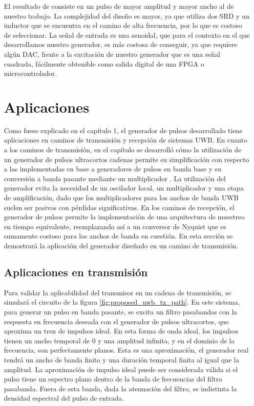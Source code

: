 El resultado de \cite{oloumi2018} consiste en un pulso de mayor amplitud y mayor
ancho al de nuestro trabajo. La complejidad del diseño es mayor, ya que utiliza
dos SRD y un inductor que se encuentra en el camino de alta frecuencia, por lo
que es costoso de seleccionar. La señal de entrada es una senoidal, que para el
contexto en el que desarrollamos nuestro generador, es más costosa de conseguir,
ya que requiere algún DAC, frente a la excitación de nuestro generador que es
una señal cuadrada, fácilmente obtenible como salida digital de una FPGA o
microcontrolador.

\section{Aplicaciones}

Como fuese explicado en el capítulo 1, el generador de pulsos desarrollado tiene
aplicaciones en caminos de transmisión y recepción de sistemas UWB. En cuanto a
los caminos de transmisión, en el
capítulo se desarrolló cómo la utilización de un generador de pulsos ultracortos
cadenas permite su simplificación con respecto a las implementadas en
base a generadores de pulsos en banda base y su conversión a banda pasante
mediante un multiplicador \cite{Altieri2021}. La utilización del generador
evita la necesidad de un oscilador local, un multiplicador y una etapa de
amplificación, dado que los multiplicadores para los anchos de banda UWB suelen
ser pasivos con pérdidas significativas. En los caminos de recepción, el
generador de pulsos permite la implementación de una arquitectura de muestreo en
tiempo equivalente, reemplazando así a un conversor de Nyquist que es sumamente
costoso para los anchos de banda en cuestión. En esta sección se demostrará la
aplicación del generador diseñado en un camino de transmisión.

\subsection{Aplicaciones en transmisión}

Para validar la aplicabilidad del transmisor en un cadena de transmisión, se
simulará el circuito de la figura \ref{fig:proposed_uwb_tx_path}. En este
sistema, para generar un pulso en banda pasante, se excita un filtro pasabandas
con la respuesta en frecuencia deseada con el generador de pulsos ultracortos,
que aproxima un tren de impulsos ideal.  En esta forma de onda ideal, los
impulsos tienen un ancho temporal de 0 y una amplitud infinita, y en el dominio
de la frecuencia, son perfectamente planos.  Esta es una aproximación, el
generador real tendrá un ancho de banda finito y una duración temporal finita al
igual que la amplitud. La aproximación de impulso ideal puede ser considerada
válida si el pulso tiene un espectro plano dentro de la banda de frecuencias del
filtro pasabanda. Fuera de esta banda, dada la atenuación del filtro, es
indistinta la densidad espectral del pulso de entrada.


